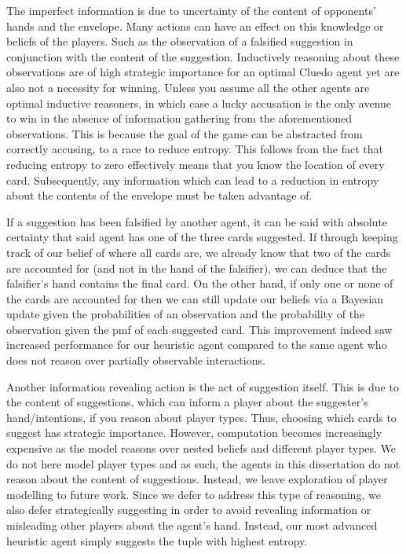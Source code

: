 \documentclass[msc, deptreport, ai, romanprepages]{infthesis}
\begin{document}
The imperfect information is due to uncertainty of the content of opponents’ hands and the envelope. Many actions can have an effect on this knowledge or beliefs of the players. Such as the observation of a falsified suggestion in conjunction with the content of the suggestion. Inductively reasoning about these observations are of high strategic importance for an optimal Cluedo agent yet are also not a necessity for winning. Unless you assume all the other agents are optimal inductive reasoners, in which case a lucky accusation is the only avenue to win in the absence of information gathering from the aforementioned observations. This is because the goal of the game can be abstracted from correctly accusing, to a race to reduce entropy. This follows from the fact that reducing entropy to zero effectively means that you know the location of every card. Subsequently, any information which can lead to a reduction in entropy about the contents of the envelope must be taken advantage of. 

If a suggestion has been falsified by another agent, it can be said with absolute certainty that said agent has one of the three cards suggested. If through keeping track of our belief of where all cards are, we already know that two of the cards are accounted for (and not in the hand of the falsifier), we can deduce that the falsifier’s hand contains the final card. On the other hand, if only one or none of the cards are accounted for then we can still update our beliefs via a Bayesian update given the probabilities of an observation and the probability of the observation given the pmf of each suggested card. This improvement indeed saw increased performance for our heuristic agent compared to the same agent who does not reason over partially observable interactions. 

Another information revealing action is the act of suggestion itself. This is due to the content of suggestions, which can inform a player about the suggester’s hand/intentions, if you reason about player types. Thus, choosing which cards to suggest has strategic importance. However, computation becomes increasingly expensive as the model reasons over nested beliefs and different player types. We do not here model player types and as such, the agents in this dissertation do not reason about the content of suggestions. Instead, we leave exploration of player modelling to future work. Since we defer to address this type of reasoning, we also defer strategically suggesting in order to avoid revealing information or misleading other players about the agent’s hand. Instead, our most advanced heuristic agent simply suggests the tuple with highest entropy. 
\end{document}
